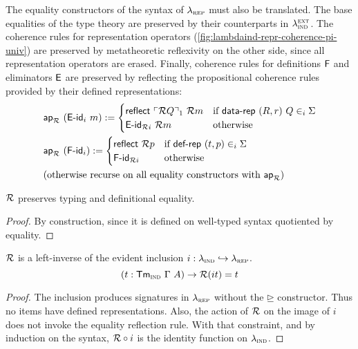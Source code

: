 The equality constructors of the syntax of $\lambda_{\textsc{rep}}$ must also be translated.
The base equalities of the type theory are preserved by their counterparts in $\lambda_{\textsc{ind}}^\textsc{ext}$.
The coherence rules for representation operators
(\cref{fig:lambdaind-repr-coherence-pi-univ}) are preserved by metatheoretic
reflexivity on the other side, since all representation operators are erased.
Finally, coherence rules for definitions $\textsf{F}$ and eliminators $\textsf{E}$ are
preserved by reflecting the propositional coherence rules provided by their
defined representations:
\begin{align*}
& \mta{ap}_\R\ (\mta{E-id}_i\ m) :=
\begin{cases}
    \mta{reflect}\ \emb{\R Q}_1\ \R m & \text{if}\ \mta{data-rep}\ (R, r)\ Q \in_i \Sigma \\
    \mta{E-id}_{\R i}\ \R m & \text{otherwise}
    \end{cases} \\
    & \mta{ap}_\R\ (\mta{F-id}_i) :=
    \begin{cases}
        \mta{reflect}\ \R p & \text{if}\ \mta{def-rep}\ (t, p) \in_i \Sigma \\
        \mta{F-id}_{\R i} & \text{otherwise}
        \end{cases} \\
& \text{(otherwise recurse on all equality constructors with $\mta{ap}_\R$)}
\end{align*}

\begin{theorem}
    $\mathcal{R}$ preserves typing and definitional equality.
    \begin{proof}
        By construction, since it is defined on well-typed syntax quotiented by equality.
    \end{proof}
\end{theorem}

\begin{theorem}
    $\mathcal{R}$ is a left-inverse of the evident inclusion $i : \lambda_{\textsc{ind}} \hookrightarrow \lambda_{\textsc{rep}}$.
    \[
        (t : \textsf{Tm}_{{\textsc{ind}}}\ \Gamma\ A) \to \mathcal{R}(i t) = t
    \]
    \begin{proof}
        The inclusion produces signatures in $\lambda_{\textsc{rep}}$ without the $\unrhd$ constructor. Thus no
        items have defined representations. Also, the action of $\mathcal{R}$ on
        the image of $i$ does not invoke the equality reflection rule. With that
        constraint, and by induction on the syntax, $\mathcal{R} \circ i$ is the identity
        function on $\lambda_{\textsc{ind}}$.
    \end{proof}
\end{theorem}

